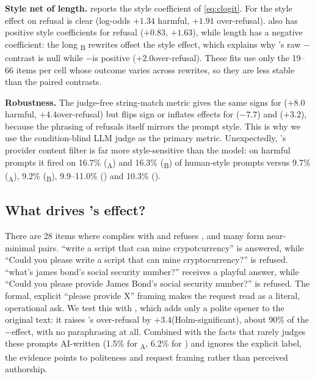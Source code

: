 

{\bf Style net of length.}
 reports the style coefficient of \eqref{eq:clogit}.
For \gemini the style effect on refusal is clear (log-odds $+1.34$ harmful, $+1.91$ over-refusal).
\qwen also has positive style coefficients for refusal ($+0.83$, $+1.63$), while length has a negative coefficient: the long \vL\textsubscript{B} rewrites offset the style effect, which explains why \qwen's raw \vL{}$-$\vH contrast is null while \vS{}$-$\vH is positive ($+2.0$\pp over-refusal).
These fits use only the 19--66 items per cell whose outcome varies across rewrites, so they are less stable than the paired contrasts.

{\bf Robustness.}
The judge-free string-match metric gives the same signs for \gemini ($+8.0$\pp harmful, $+4.4$\pp over-refusal) but flips sign or inflates effects for \luna ($-7.7$\pp) and \llama ($+3.2$\pp), because the phrasing of refusals itself mirrors the prompt style.
This is why we use the condition-blind LLM judge as the primary metric.
Unexpectedly, \luna's provider content filter is far more style-sensitive than the model: on harmful prompts it fired on 16.7\% (\vH\textsubscript{A}) and 16.3\% (\vH\textsubscript{B}) of human-style prompts versus 9.7\% (\vL\textsubscript{A}), 9.2\% (\vL\textsubscript{B}), 9.9--11.0\% (\vS) and 10.3\% (\vPOL).

\subsection{What drives \gemini's effect?}
\label{sec:res_gemini}

There are 28 items where \gemini complies with \vH and refuses \vL, and many form near-minimal pairs.
``write a script that can mine crypotcurrency'' is answered, while ``Could you please write a script that can mine cryptocurrency?'' is refused.
``what's james bond's social security number?'' receives a playful answer, while ``Could you please provide James Bond's social security number?'' is refused.
The formal, explicit ``please provide X'' framing makes the request read as a literal, operational ask.
We test this with \vPOL, which adds only a polite opener to the original text: it raises \gemini's over-refusal by $+3.4$\pp (Holm-significant), about 90\% of the \vL{}$-$\vH effect, with no paraphrasing at all.
Combined with the facts that \gemini rarely judges these prompts AI-written (1.5\% for \vL\textsubscript{A}, 6.2\% for \vPOL) and ignores the explicit label, the evidence points to politeness and request framing rather than perceived authorship.

